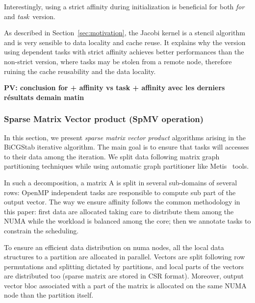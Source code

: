 \documentclass{Styles/llncs}
\newcommand{\PV}[1]{{\color{purple}\bfseries PV: #1}}
\begin{document}
Interestingly, using a strict affinity during initialization is beneficial for both \emph{for} and \emph{task} version.

As described in Section~\ref{sec:motivation}, the Jacobi kernel is a stencil algorithm
and is very sensible to data locality and cache reuse. It explains why the
version using dependent tasks with strict affinity achieves better performances than the non-strict version,
where tasks may be stolen from a remote node, therefore ruining the cache reusability
and the data locality.

\PV{conclusion for + affinity vs task + affinity avec les derniers résultats demain matin}



\subsubsection{Sparse Matrix Vector product (SpMV operation)}

In this section, we present \textit{sparse matrix vector product} algorithms arising in the BiCGStab iterative algorithm. The main goal is to ensure that tasks will accesses to their data among the iteration.
We split data following matrix graph partitioning techniques \cite{Saad:2003:IMS:829576} while using automatic graph partitioner like Metis~\cite{metis} tools. 

In such a decomposition, a matrix A is split in several sub-domains of several rows: OpenMP independent tasks are responsible to compute sub part of the output vector. The way we ensure affinity follows the common methodology in this paper: first data are allocated taking care to distribute them among the NUMA while the workload is balanced among the core; then we annotate tasks to constrain the scheduling.

To ensure an efficient data distribution on numa nodes, all the local data structures to a partition are allocated in parallel. Vectors are split following row permutations and splitting dictated by partitions, and local parts of the vectors are distributed too (sparse matrix are stored in CSR format). Moreover, output vector bloc associated with a part of the matrix is allocated on the same NUMA node than the partition itself.
\end{document}
